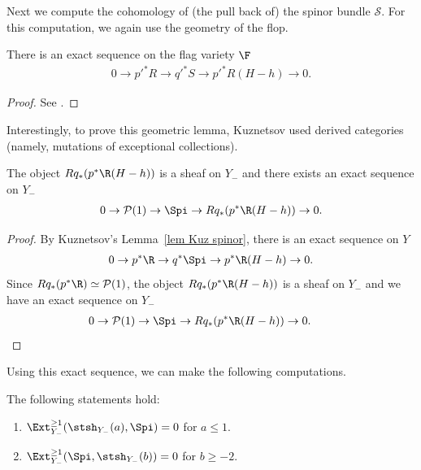 Next we compute the cohomology of (the pull back of) the spinor bundle $\mathcal{S}$.
For this computation, we again use the geometry of the flop.

\begin{Lemma} \label{lem Kuz spinor}
There is an exact sequence on the flag variety $\F$
\begin{gather*}
0 \to p'^* R \to q'^*S \to p'^*R(H-h) \to 0.
\end{gather*}
\end{Lemma}

\begin{proof}
See \cite[Proposition 3 and Lemma 4]{Kuz18}.
\end{proof}

\begin{Remark} \rm
Interestingly, to prove this geometric lemma, Kuznetsov used derived categories (namely, mutations of exceptional collections).
\end{Remark}

\begin{Corollary}
The object $Rq_*(p^*\R(H-h))$ is a sheaf on $Y_-$ and
there exists an exact sequence on $Y_-$
\begin{gather*}
0 \to \mathcal{P}(1) \to \Spi \to Rq_*(p^*\R(H-h)) \to 0.
\end{gather*}
\end{Corollary}

\begin{proof}
By Kuznetsov's Lemma~\ref{lem Kuz spinor}, there is an exact sequence on $Y$
\begin{gather*}
0 \to p^*\R \to q^*\Spi \to p^*\R(H-h) \to 0.
\end{gather*}
Since $Rq_*(p^*\R) \simeq \mathcal{P}(1)$,
the object $Rq_*(p^*\R(H-h))$ is a sheaf on $Y_-$ and
we have an exact sequence on $Y_-$
\begin{gather*}
0 \to \mathcal{P}(1) \to \Spi \to Rq_*(p^*\R(H-h)) \to 0. \tag*{\qed}
\end{gather*}
\renewcommand{\qed}{}
\end{proof}

Using this exact sequence, we can make the following computations.

\begin{Lemma} \label{lemma314}
The following statements hold:
\begin{enumerate}\itemsep=0pt
\item[$1.$] $\Ext_{Y_-}^{\geq 1}(\stsh_{Y_-}(a), \Spi) = 0$
for $a \leq 1$.
\item[$2.$] $\Ext_{Y_-}^{\geq 1}(\Spi, \stsh_{Y_-}(b)) = 0$ for $b \geq -2$.
\end{enumerate}
\end{Lemma}

